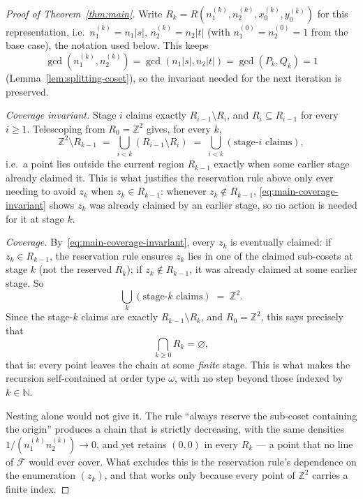 \documentclass[a4paper,11pt,oneside,reqno]{amsart}
\theoremstyle{definition}
\theoremstyle{remark}
\theoremstyle{plain}
\newcommand{\Z}{\mathbb{Z}}
\newcommand{\N}{\mathbb{N}}
\begin{document}
\begin{proof}[Proof of Theorem~\ref{thm:main}]
  Write
  \(R_k=R(n_1^{(k)},n_2^{(k)},x_0^{(k)},y_0^{(k)})\) for this representation, i.e.\
  \(n_1^{(k)}=n_1|s|\), \(n_2^{(k)}=n_2|t|\) (with \(n_1^{(0)}=n_2^{(0)}=1\) from the base case), the
  notation used below. This keeps
  \[
    \gcd(n_1^{(k)},n_2^{(k)}) = \gcd(n_1|s|,n_2|t|) = \gcd(P_k,Q_k) = 1
  \]
  (Lemma~\ref{lem:splitting-coset}), so the invariant needed for the next iteration is preserved.

  \emph{Coverage invariant.} Stage \(i\) claims exactly \(R_{i-1}\setminus R_i\), and \(R_i\subseteq
  R_{i-1}\) for every \(i\ge1\). Telescoping from \(R_0=\Z^2\) gives, for every \(k\),
  \begin{equation}
    \label{eq:main-coverage-invariant}
    \Z^2\setminus R_{k-1} \;=\; \bigcup_{i<k}(R_{i-1}\setminus R_i) \;=\; \bigcup_{i<k}
    (\text{stage-}i\text{ claims}),
  \end{equation}
  i.e.\ a point lies outside the current region \(R_{k-1}\) exactly when some earlier stage already
  claimed it. This is what justifies the reservation rule above only ever needing to avoid \(z_k\)
  when \(z_k\in R_{k-1}\): whenever \(z_k\notin R_{k-1}\), \eqref{eq:main-coverage-invariant} shows
  \(z_k\) was already claimed by an earlier stage, so no action is needed for it at stage \(k\).

  \emph{Coverage.} By~\eqref{eq:main-coverage-invariant}, every \(z_k\) is eventually claimed: if
  \(z_k\in R_{k-1}\), the reservation rule ensures \(z_k\) lies in one of the claimed sub-cosets at
  stage \(k\) (not the reserved \(R_k\)); if \(z_k\notin R_{k-1}\), it was already claimed at some
  earlier stage. So
  \begin{equation}
    \label{eq:main-coverage}
    \bigcup_k(\text{stage-}k\text{ claims}) \;=\; \Z^2.
  \end{equation}
  Since the stage-\(k\) claims are exactly \(R_{k-1}\setminus R_k\), and \(R_0=\Z^2\), this says
  precisely that
  \[\bigcap_{k\ge0} R_k=\varnothing,\]
  that is: every point leaves the chain at some \emph{finite} stage. This is what makes the
  recursion self-contained at order type \(\omega\), with no step beyond those indexed by
  \(k\in\N\).

  Nesting alone would not give it. The rule ``always reserve the sub-coset containing the origin''
  produces a chain that is strictly decreasing, with the same densities
  \(1/(n_1^{(k)}n_2^{(k)})\to0\), and yet retains \((0,0)\) in every \(R_k\) --- a point that no line
  of \(\mathcal F\) would ever cover. What excludes this is the reservation rule's dependence on the
  enumeration \((z_k)\), and that works only because every point of \(\Z^2\) carries a finite index.


\end{proof}
\end{document}
